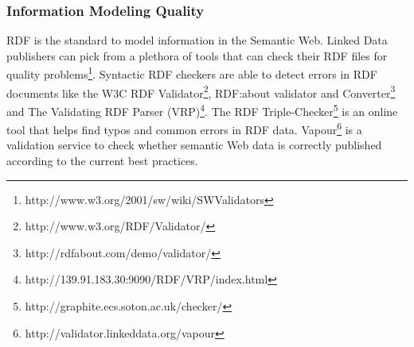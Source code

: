 \documentclass[onecolumn, crcready]{iosart2c}
\begin{document}
\subsubsection{Information Modeling Quality}
RDF is the standard to model information in the Semantic Web. Linked Data publishers can pick from a plethora of tools that can check their RDF files for quality problems\footnote{http://www.w3.org/2001/sw/wiki/SWValidators}. Syntactic RDF checkers are able to detect errors in RDF documents like the W3C RDF Validator\footnote{http://www.w3.org/RDF/Validator/}, RDF:about validator and Converter\footnote{http://rdfabout.com/demo/validator/} and The Validating RDF Parser (VRP)\footnote{http://139.91.183.30:9090/RDF/VRP/index.html}. The RDF Triple-Checker\footnote{http://graphite.ecs.soton.ac.uk/checker/} is an online tool that helps find typos and common errors in RDF data. Vapour\footnote{http://validator.linkeddata.org/vapour} \cite{Berrueta08cookinghttp} is a validation service to check whether semantic Web data is correctly published according to the current best practices\cite{tim:linkedata}.
\end{document}

